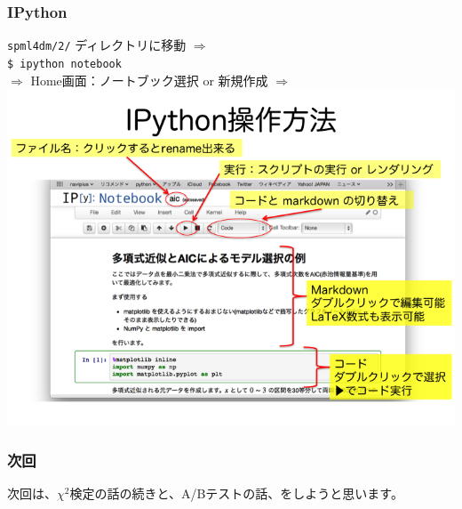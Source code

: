 \documentclass{beamer}
\begin{document}
\begin{frame}
  \frametitle{IPython}
  \texttt{spml4dm/2/} ディレクトリに移動 $\Rightarrow$ \\
  \texttt{\$ ipython notebook} \\
  $\Rightarrow$ Home画面：ノートブック選択 or 新規作成 $\Rightarrow$ 
  \includegraphics[clip, width=\textwidth, natwidth=720, natheight=540, trim=0 0 0 75]{ipython_usage.png}
\end{frame}
\begin{frame}
  \frametitle{次回}
  次回は、$\chi^2$検定の話の続きと、A/Bテストの話、をしようと思います。
\end{frame}
\end{document}
